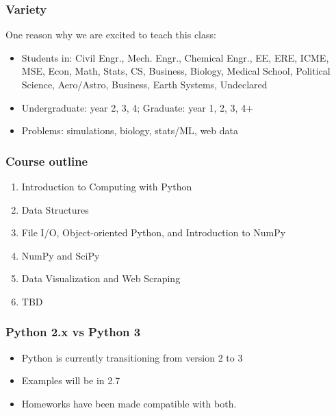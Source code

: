 \documentclass{beamer}
\begin{document}
\begin{frame}
\frametitle{Variety}
One reason why we are excited to teach this class:

\begin{itemize}
\item{Students in: Civil Engr., Mech. Engr., Chemical Engr., EE, ERE, ICME, MSE, Econ, Math, Stats, CS, Business, Biology, Medical School, Political Science, Aero/Astro, Business, Earth Systems, Undeclared}
\item{Undergraduate: year 2, 3, 4; Graduate: year 1, 2, 3, 4+}
\item{Problems: simulations, biology, stats/ML, web data}
\end{itemize}

\end{frame}








\begin{frame}
\frametitle{Course outline}

\begin{enumerate}
\setlength{\itemsep}{0.2in}

\item{Introduction to Computing with Python}
\item{Data Structures}
\item{File I/O, Object-oriented Python, and Introduction to NumPy}
\item{NumPy and SciPy}
\item{Data Visualization and Web Scraping}
\item{TBD}

\end{enumerate}
\end{frame}


\begin{frame}
\frametitle{Python 2.x vs Python 3}

\begin{itemize}
\setlength{\itemsep}{0.2in}
\item{Python is currently transitioning from version 2 to 3}
\item{Examples will be in 2.7}
\item{Homeworks have been made compatible with both.}
\end{itemize}

\end{frame}
\end{document}
